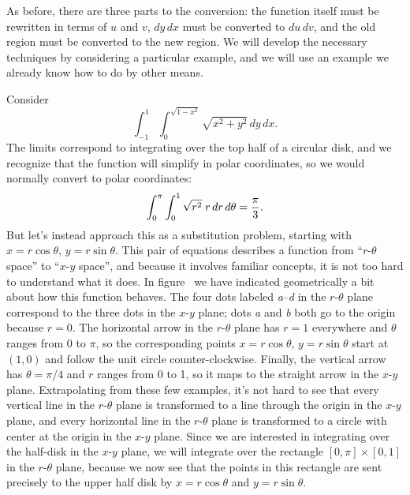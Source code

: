 As before, there are three parts to the conversion: the function
itself must be rewritten in terms of $u$ and $v$, $dy\,dx$ must be
converted to $du\,dv$, and the old region must be converted to the new
region. We will develop the necessary techniques by considering a
particular example, and we will use an example we already know how to
do by other means.

Consider 
$$\int_{-1}^1\int_0^{\sqrt{1-x^2}} \sqrt{x^2+y^2}\,dy\,dx.$$
The limits correspond to integrating over the top half of a circular
disk, and we recognize that the function will simplify in polar
coordinates, so we would normally convert to polar coordinates:
$$\int_{0}^\pi\int_0^1 \sqrt{r^2}\;r\,dr\,d\theta={\pi\over3}.$$
But let's instead approach this as a substitution problem, starting
with $x=r\cos\theta$, $y=r\sin\theta$. This pair of equations
describes a function from ``$r$-$\theta$ space'' to ``$x$-$y$ space'',
and because it involves familiar concepts, it is not too hard to
understand what it does. In figure~ we have indicated geometrically a bit about how this
function behaves. The four dots labeled {\it a}--{\it d} in the $r$-$\theta$ plane
correspond to the three dots in the $x$-$y$ plane; dots {\it a} and 
{\it b} both
go to the origin because $r=0$. The horizontal arrow in the
$r$-$\theta$ plane has $r=1$ everywhere and $\theta$ ranges from 0 to
$\pi$, so the corresponding points 
$x=r\cos\theta$, $y=r\sin\theta$ start at $(1,0)$ and follow the unit
circle counter-clockwise. Finally, the vertical arrow has
$\theta=\pi/4$ and $r$ ranges from 0 to 1, so it maps to the straight
arrow in the $x$-$y$ plane. Extrapolating from these few examples,
it's not hard to see that every vertical line in the $r$-$\theta$ plane
is transformed to a line through the origin in the $x$-$y$ plane, and
every horizontal line in the $r$-$\theta$ plane
is transformed to a circle with center at the origin in the $x$-$y$
plane. Since we are interested in integrating over the half-disk in
the $x$-$y$ plane, we will integrate over the rectangle
$[0,\pi]\times[0,1]$ in the $r$-$\theta$ plane, because we now see
that the points in this rectangle are sent precisely to the upper half
disk by $x=r\cos\theta$ and $y=r\sin\theta$.

